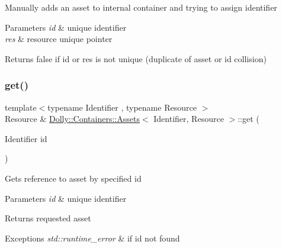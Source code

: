 Manually adds an asset to internal container and trying to assign identifier 
\begin{DoxyParams}{Parameters}
{\em id} & unique identifier \\
\hline
{\em res} & resource unique pointer\\
\hline
\end{DoxyParams}
\begin{DoxyReturn}{Returns}
false if id or res is not unique (duplicate of asset or id collision) 
\end{DoxyReturn}
\mbox{\label{class_dolly_1_1_containers_1_1_assets_abe6916123b573c9a4440e15213168ad8}} 
\subsubsection{\texorpdfstring{get()}{get()}\hspace{0.1cm}{\footnotesize\ttfamily [1/2]}}
{\footnotesize\ttfamily template$<$typename Identifier , typename Resource $>$ \\
Resource \& \hyperlink{class_dolly_1_1_containers_1_1_assets}{Dolly\+::\+Containers\+::\+Assets}$<$ Identifier, Resource $>$\+::get (\begin{DoxyParamCaption}\item[{Identifier}]{id }\end{DoxyParamCaption})}

Gets reference to asset by specified id 
\begin{DoxyParams}{Parameters}
{\em id} & unique identifier\\
\hline
\end{DoxyParams}
\begin{DoxyReturn}{Returns}
requested asset 
\end{DoxyReturn}

\begin{DoxyExceptions}{Exceptions}
{\em std\+::runtime\+\_\+error} & if id not found \\
\hline
\end{DoxyExceptions}
\mbox{\label{class_dolly_1_1_containers_1_1_assets_a07cfae702a571e0dd17c44e531f7823d}} 
